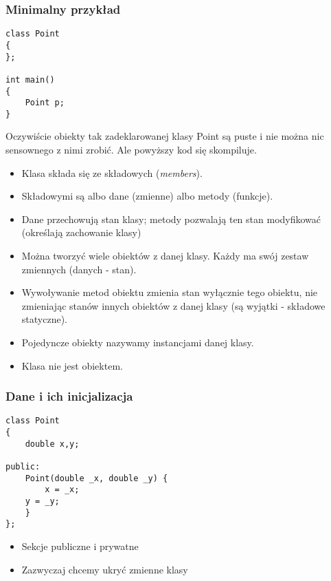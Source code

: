 \documentclass[pdftex, smaller]{beamer}
\begin{document}
\begin{frame}[fragile]
\frametitle{Minimalny przykład}

\begin{lstlisting}
class Point
{
};

int main()
{
    Point p;
}
\end{lstlisting}

Oczywiście obiekty tak zadeklarowanej klasy Point są puste i nie można nic sensownego z nimi zrobić. Ale powyższy kod się skompiluje.

\end{frame}

\begin{frame}

\begin{itemize}
\item Klasa składa się ze składowych (\emph{members}).
\item Składowymi są albo dane (zmienne) albo metody (funkcje).
\item Dane przechowują stan klasy; metody pozwalają ten stan modyfikować (określają zachowanie klasy)
\item Można tworzyć wiele obiektów z danej klasy. Każdy ma swój zestaw zmiennych (danych - stan).
\item Wywoływanie metod obiektu zmienia stan wyłącznie tego obiektu, nie zmieniając stanów innych obiektów z danej klasy (są wyjątki - składowe statyczne).
\item Pojedyncze obiekty nazywamy instancjami danej klasy.
\item Klasa nie jest obiektem.
\end{itemize}
\end{frame}

\begin{frame}[fragile]
\frametitle{Dane i ich inicjalizacja}

\begin{lstlisting}
class Point
{
    double x,y;
    
public:
    Point(double _x, double _y) {
    	x = _x;
	y = _y;
    }
};
\end{lstlisting}

\begin{itemize}
\item Sekcje publiczne i prywatne
\item Zazwyczaj chcemy ukryć zmienne klasy
\end{itemize}

\end{frame}
\end{document}
